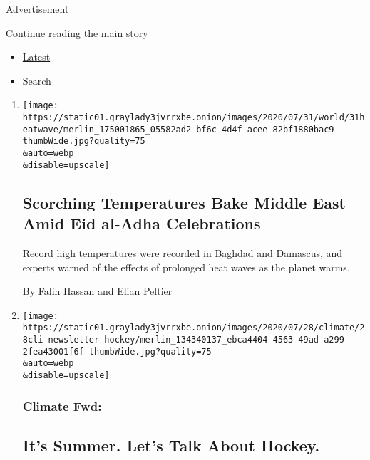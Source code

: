 Advertisement

\protect\hyperlink{after-mid1}{Continue reading the main story}

\begin{itemize}
\tightlist
\item
  \protect\hyperlink{stream-panel}{Latest}
\item
  Search
\end{itemize}

\begin{enumerate}
\def\labelenumi{\arabic{enumi}.}
\item
  \href{/2020/07/31/world/middleeast/Middle-East-heat-wave.html}{}

  \texttt{[image: https://static01.graylady3jvrrxbe.onion/images/2020/07/31/world/31heatwave/merlin\_175001865\_05582ad2-bf6c-4d4f-acee-82bf1880bac9-thumbWide.jpg?quality=75\\\&auto=webp\\\&disable=upscale]}

  \hypertarget{scorching-temperatures-bake-middle-east-amid-eid-al-adha-celebrations}{%
  \subsection{Scorching Temperatures Bake Middle East Amid Eid al-Adha
  Celebrations}\label{scorching-temperatures-bake-middle-east-amid-eid-al-adha-celebrations}}

  Record high temperatures were recorded in Baghdad and Damascus, and
  experts warned of the effects of prolonged heat waves as the planet
  warms.

  By Falih Hassan and Elian Peltier
\item
  \href{/2020/07/29/climate/skating-hockey-climate-change.html}{}

  \texttt{[image: https://static01.graylady3jvrrxbe.onion/images/2020/07/28/climate/28cli-newsletter-hockey/merlin\_134340137\_ebca4404-4563-49ad-a299-2fea43001f6f-thumbWide.jpg?quality=75\\\&auto=webp\\\&disable=upscale]}

  \hypertarget{climate-fwd}{%
  \subsubsection{Climate Fwd:}\label{climate-fwd}}

  \hypertarget{its-summer-lets-talk-about-hockey}{%
  \subsection{It's Summer. Let's Talk About
  Hockey.}\label{its-summer-lets-talk-about-hockey}}


\end{enumerate}
